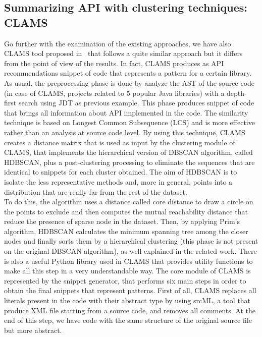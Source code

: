  


\subsection{Summarizing API with clustering techniques: CLAMS}
Go further with the examination of the existing approaches, we have also CLAMS tool proposed in~\cite{katirtzis_summarizing_2018} that follows a quite similar approach but it differs from the point of view of the results. In fact, CLAMS produces as API recommendations snippet of code that represents a pattern for a certain library. As usual, the preprocessing phase is done by analyze the AST of the source code (in case of CLAMS, projects related to 5 popular Java libraries) with a depth-first search using JDT as previous example. This phase produces snippet of code that brings all information about API implemented in the code. The similarity technique is based on Longest Common Subsequence (LCS) and is more effective rather than an analysis at source code level. By using this technique, CLAMS creates a distance matrix that is used as input by the clustering module of CLAMS, that implements the hierarchical version of DBSCAN algorithm, called HDBSCAN, plus a post-clustering processing to eliminate the sequences that are identical to snippets for each cluster obtained. The aim of HDBSCAN is to isolate the less representative methods and, more in general, points into a distribution that are really far from the rest of the dataset. \\
To do this, the algorithm uses a distance called core distance to draw a circle on the points to exclude and then computes the mutual reachability distance that reduce the presence of sparse node in the dataset. Then, by applying Prim's algorithm, HDBSCAN calculates the minimum spanning tree among the closer nodes and finally sorts them by a hierarchical clustering (this phase is not present on the original DBSCAN algorithm), as well explained in the related work. There is also a useful Python library used in CLAMS that provides utility functions to make all this step in a very understandable way. The core module of CLAMS is represented by the snippet generator, that performs six main steps in order to obtain the final snippets that represent patterns. First of all, CLAMS replaces all literals present in the code with their abstract type by using srcML, a tool that produce XML file starting from a source code, and removes all comments. At the end of this step, we have code with the same structure of the original source file but more abstract.\\
